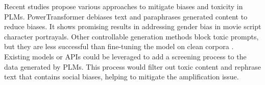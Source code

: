 \documentclass{article}
\begin{document}
Recent studies propose various approaches to mitigate biases and toxicity in PLMs. 
PowerTransformer \cite{ma-etal-2020-powertransformer} debiases text and paraphrases 
generated content to reduce biases. It shows promising results in addressing gender 
bias in movie script character portrayals. Other controllable generation methods block 
toxic prompts, but they are less successful than fine-tuning the model on clean corpora 
\cite{gehman-etal-2020-realtoxicityprompts}.
Existing models or APIs could be leveraged to add a screening process to the data 
generated by PLMs. This process would filter out toxic content and rephrase text 
that contains social biases, helping to mitigate the amplification issue.



\end{document}
